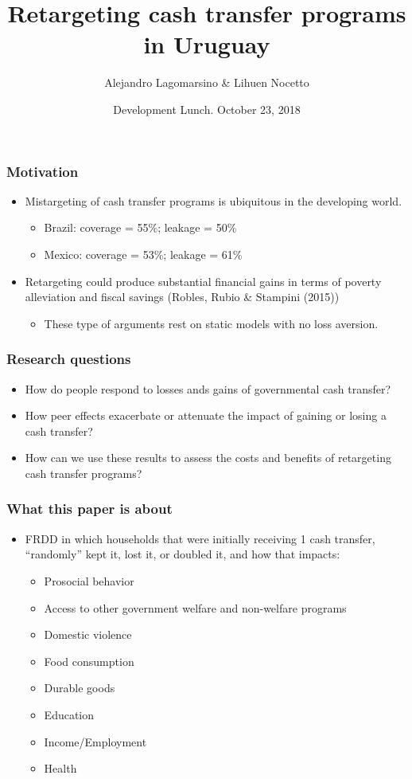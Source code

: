 \documentclass{beamer}
\title[Retargeting cash transfer programs] %
{Retargeting cash transfer programs in Uruguay}
\author[Alejandro Lagomarsino] %
{Alejandro Lagomarsino \& Lihuen Nocetto\inst{*} }
\institute[Harvard University] %
{
	\inst{*}%
	Harvard University\\
	Pontifical Catholic University of Chile
}
\date[October. 2018] %
{Development Lunch. October 23, 2018}
\begin{document}
	\setlength{\parindent}{10pt}
	
	\frame{\titlepage}

\begin{frame}
\frametitle{Motivation}
\begin{itemize}
	\item Mistargeting of cash transfer programs is ubiquitous in the developing world.
	\begin{itemize}
		\item Brazil: coverage = 55\%; leakage = 50\%
		\item Mexico: coverage = 53\%; leakage = 61\%
	\end{itemize}
	\item Retargeting could produce substantial financial gains in terms of poverty alleviation and fiscal savings (Robles, Rubio \& Stampini (2015))
	\begin{itemize}
		\item These type of arguments rest on static models with no loss aversion.
	\end{itemize}
\end{itemize}
\end{frame}

\begin{frame}
\frametitle{Research questions}
\begin{itemize}
	\item How do people respond to losses ands gains of governmental cash transfer?
	\item How peer effects exacerbate or attenuate the impact of gaining or losing a cash transfer?
	\item How can we use these results to assess the costs and benefits of retargeting cash transfer programs?	
\end{itemize}
\end{frame}

\begin{frame}
\frametitle{What this paper is about}
\begin{itemize}
\item FRDD in which households that were initially receiving 1 cash transfer, ``randomly'' kept it, lost it, or doubled it, and how that impacts:
\begin{itemize}
	\item Prosocial behavior
	\item Access to other government welfare and non-welfare programs
	\item Domestic violence
	\item Food consumption
	\item Durable goods
	\item Education
	\item Income/Employment
	\item Health
\end{itemize}
\end{itemize}
\end{frame}
\end{document}
